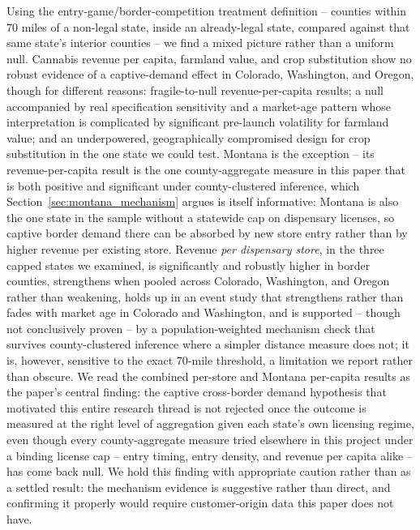 ﻿\documentclass{article}
\begin{document}
Using the entry-game/border-competition treatment definition -- counties within 70 miles of a non-legal
state, inside an already-legal state, compared against that same state's interior counties -- we find a
mixed picture rather than a uniform null. Cannabis revenue per capita, farmland value, and crop
substitution show no robust evidence of a captive-demand effect in Colorado, Washington, and Oregon, though
for different reasons: fragile-to-null revenue-per-capita results; a null accompanied by real specification
sensitivity and a market-age pattern whose interpretation is complicated by significant pre-launch
volatility for farmland value; and an underpowered, geographically compromised design for crop substitution
in the one state we could test. Montana is the exception -- its revenue-per-capita result is the one
county-aggregate measure in this paper that is both positive and significant under county-clustered
inference, which Section~\ref{sec:montana_mechanism} argues is itself informative: Montana is also the one
state in the sample without a statewide cap on dispensary licenses, so captive border demand there can be
absorbed by new store entry rather than by higher revenue per existing store. Revenue \emph{per dispensary
store}, in the three capped states we examined, is significantly and robustly higher in border counties,
strengthens when pooled across Colorado, Washington, and Oregon rather than weakening, holds up in an event
study that strengthens rather than fades with market age in Colorado and Washington, and is supported --
though not conclusively proven -- by a population-weighted mechanism check that survives county-clustered
inference where a simpler distance measure does not; it is, however, sensitive to the exact 70-mile
threshold, a limitation we report rather than obscure. We read the combined per-store and Montana
per-capita results as the paper's central finding: the captive cross-border demand hypothesis that
motivated this entire research thread is not rejected once the outcome is measured at the right level of
aggregation given each state's own licensing regime, even though every county-aggregate measure tried
elsewhere in this project under a binding license cap -- entry timing, entry density, and revenue per
capita alike -- has come back null. We hold this finding with appropriate caution rather than as a settled
result: the mechanism evidence is suggestive rather than direct, and confirming it properly would require
customer-origin data this paper does not have.

\newpage


\end{document}
